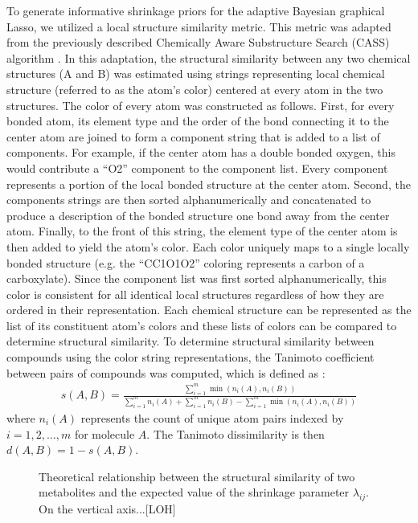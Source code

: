 To generate informative shrinkage priors for the adaptive Bayesian graphical Lasso, we utilized a local structure similarity metric. This metric was adapted from the previously described Chemically Aware Substructure Search (CASS) algorithm \cite{mitchell2014}. In this adaptation, the structural similarity between any two chemical structures (A and B)  was estimated using strings representing local chemical structure (referred to as the atom’s color) centered at every atom in the two structures. The color of every atom was constructed as follows. First, for every bonded atom, its element type and the order of the bond connecting it to the center atom are joined to form a component string that is added to a list of components. For example, if the center atom has a double bonded oxygen, this would contribute a ``O2'' component to the component list. Every component represents a portion of the local bonded structure at the center atom. Second, the components strings are then sorted alphanumerically and concatenated to produce a description of the bonded structure one bond away from the center atom. Finally, to the front of this string, the element type of the center atom is then added to yield the atom’s color. Each color uniquely maps to a single locally bonded structure (e.g. the ``CC1O1O2'' coloring represents a carbon of a carboxylate). Since the component list was first sorted alphanumerically, this color is consistent for all identical local structures regardless of how they are ordered in their representation. Each chemical structure can be represented as the list of its constituent atom’s colors and these lists of colors can be compared to determine structural similarity. To determine structural similarity between compounds using the color string representations, the Tanimoto coefficient between pairs of compounds was computed, which is defined as \cite{chen2002}:
\begin{align}
	s(A,B)=\frac{\sum_{i=1}^m \min \left(n_i(A),n_i(B) \right)}{\sum_{i=1}^m n_i(A)+\sum_{i=1}^m n_i(B)-\sum_{i=1}^m \min \left(n_i(A),n_i(B) \right)}
\end{align}
where $n_i(A)$ represents the count of unique atom pairs indexed by $i=1,2,\hdots,m$ for molecule $A$. The Tanimoto dissimilarity is then $d(A,B)=1-s(A,B)$. 

\begin{figure}[ht]
	\caption[Structural similarity versus shrinkage]{Theoretical relationship between the structural similarity of two metabolites and the expected value of the shrinkage parameter $\lambda_{ij}$. On the vertical axis...[LOH] \label{fig:simShrink} }
\end{figure}

